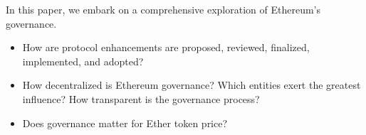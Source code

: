 \documentclass[12pt]{beamer}
\newcommand\fitem{\vfill\item}
\begin{document}

\begin{frame}[fragile]{In this paper, we embark on a comprehensive exploration of Ethereum's governance.}

\begin{itemize}
    \fitem  How are protocol enhancements are proposed, reviewed, finalized, implemented, and adopted? 
    \fitem How decentralized is Ethereum governance? Which entities exert the greatest influence? How transparent is the governance process?
    \fitem Does governance matter for Ether token price?
\end{itemize}

\end{frame}

\end{document}
